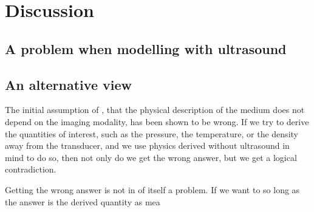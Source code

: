 



\section{Discussion}




\subsection{A problem when modelling with ultrasound}

\subsection{An alternative view}
The initial assumption of \secref{}, that the physical description of the medium does not depend on the imaging modality, has been shown to be wrong.
If we try to derive the quantities of interest, such as the pressure, the temperature, or the density away from the transducer,
and we use physics derived without ultrasound in mind to do so, 
then not only do we get the wrong answer, 
but we get a logical contradiction.

Getting the wrong answer is not in of itself a problem.  
If we want to 
so long as the answer is the derived quantity as mea

